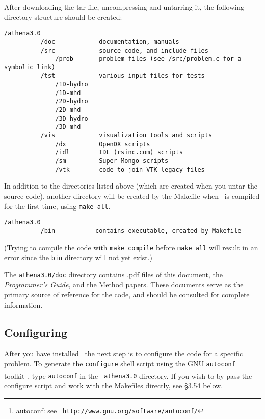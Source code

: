 After downloading the tar file, uncompressing and untarring it,
the following directory structure should be created:

\begin{verbatim}
/athena3.0
          /doc            documentation, manuals
          /src            source code, and include files
              /prob       problem files (see /src/problem.c for a symbolic link)
          /tst            various input files for tests
              /1D-hydro
              /1D-mhd
              /2D-hydro
              /2D-mhd
              /3D-hydro
              /3D-mhd
          /vis            visualization tools and scripts
              /dx         OpenDX scripts
              /idl        IDL (rsinc.com) scripts
              /sm         Super Mongo scripts
              /vtk        code to join VTK legacy files
\end{verbatim}
In addition to the directories listed above (which are created when you
untar the source code), another directory will be created by the Makefile
when \ath\ is compiled for the first time, using {\tt make all}.

\begin{verbatim}
/athena3.0
          /bin           contains executable, created by Makefile
\end{verbatim}
(Trying to compile the code with {\tt make compile} before
{\tt make all} will result in an error since the {\tt bin} directory will
not yet exist.)

The {\tt athena3.0/doc} directory contains .pdf files of this document,
the {\em Programmer's Guide}, and the Method papers.  These documents serve as
the primary source of reference for the code, and should be consulted for
complete information.

\subsection{Configuring \ath}

After you have installed \ath\, the next step is to configure the
code for a specific problem.  To generate the {\tt configure} shell
script using the GNU {\tt autoconf} toolkit\footnote{autoconf: see {\tt
http://www.gnu.org/software/autoconf/}}, type {\tt autoconf} in the {\tt
athena3.0} directory.  If you wish to by-pass the configure script and work
with the Makefiles directly, see \S 3.54 below.

